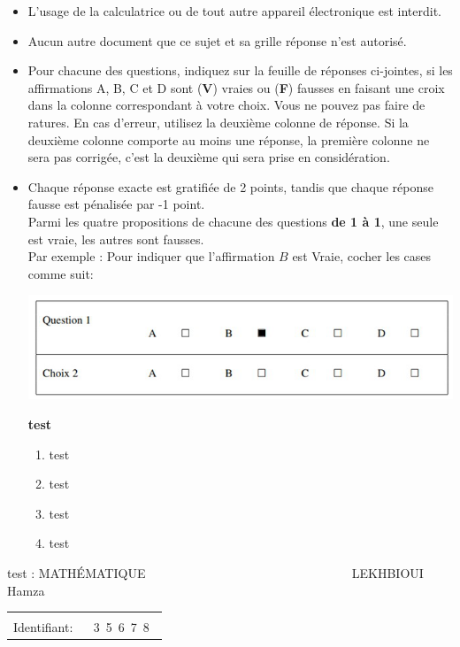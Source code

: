 \documentclass{book}%
\begin{document}
\begin{itemize}%
\item%
L'usage de la calculatrice ou de tout autre appareil électronique est interdit.%
\item%
Aucun autre document que ce sujet et sa grille réponse n'est autorisé.%
\item%
Pour chacune des questions, indiquez sur la feuille de réponses ci-jointes, si les affirmations A, B, C et D sont (\textbf{V}) vraies ou (\textbf{F}) fausses en faisant une croix dans la colonne correspondant à votre choix. Vous ne pouvez pas faire de ratures. En cas d'erreur, utilisez la deuxième colonne de réponse. Si la deuxième colonne comporte au moins une réponse, la première colonne ne sera pas corrigée, c'est la deuxième qui sera prise en considération.%
\item%
Chaque réponse exacte est gratifiée de 2 points, tandis que chaque réponse fausse est pénalisée par -1 point. \\ 	Parmi les quatre propositions de chacune des questions \textbf{de 1 à 1}, une seule est vraie, les autres sont fausses. \\ 	Par exemple : Pour indiquer que l'affirmation $B$ est Vraie, cocher les cases comme suit:  \\ \begin{center}	\includegraphics[scale=0.8]{reponses.png} \end{center}%
\thispagestyle{empty}%
\begin{exercise}%
\textbf{test }%
\begin{enumerate}[label=\textbf{\Alph*. }]%
\item%
test%
\item%
test%
\item%
test%
\item%
test%
\end{enumerate}%
\end{exercise}%
\end{itemize}%
\newpage%
\thispagestyle{empty}%
test : MATHÉMATIQUE $\qquad \qquad \qquad \qquad \qquad \qquad \qquad \qquad$ LEKHBIOUI Hamza%
\begin{flushright}%
\begin{tabular}{|l|}%
\hline%
 \\%
\thispagestyle{empty}%
Identifiant: $\quad$ {\Large 3~5~6~7~8~}%
 \\%
\hline%
\end{tabular}%
\end{flushright}%
\end{document}
